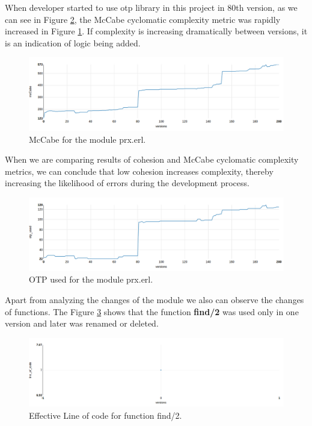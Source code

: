 When developer started to use otp library in this project in 80th version, as we can see in Figure \ref{fig:otp_prx}, the McCabe cyclomatic complexity metric was rapidly increased in Figure \ref{fig:McCabe}. If complexity is increasing dramatically between versions, it is an indication of logic 
being added. 

\begin{figure}[ht]
	\centering
	\includegraphics[width=\textwidth]{figures/mccabe.png}
	\caption{McCabe for the module prx.erl.}
	\label{fig:McCabe}
\end{figure}

When we are comparing results of cohesion and McCabe cyclomatic complexity metrics, we can conclude that low cohesion increases complexity, thereby increasing the likelihood of errors during the development process.

\begin{figure}[ht]
	\centering
	\includegraphics[width=\textwidth]{figures/otp_prx.png}
	\caption{OTP used for the module prx.erl.}
	\label{fig:otp_prx}
\end{figure}

Apart from analyzing the changes of the module we also can observe the changes of functions. The Figure \ref{fig:find/2} shows that the function \textbf{find/2} was used only in one version and later was renamed or deleted.

\begin{figure}[ht]
	\centering
	\includegraphics[width=\textwidth]{figures/find2.png}
	\caption{Effective Line of code for function find/2.}
	\label{fig:find/2}
\end{figure}

